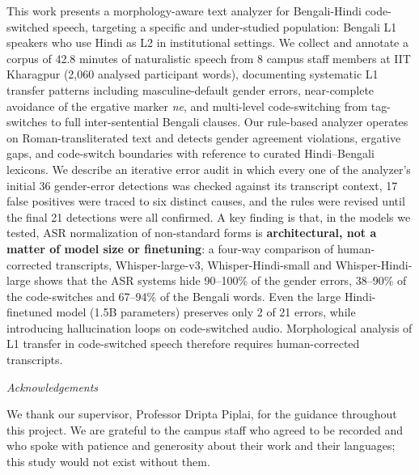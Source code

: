 \documentclass[11pt,a4paper]{report}
\begin{document}
\noindent This work presents a morphology-aware text analyzer for Bengali-Hindi code-switched speech, targeting a specific and under-studied population: Bengali L1 speakers who use Hindi as L2 in institutional settings. We collect and annotate a corpus of 42.8 minutes of naturalistic speech from 8 campus staff members at IIT Kharagpur (2,060 analysed participant words), documenting systematic L1 transfer patterns including masculine-default gender errors, near-complete avoidance of the ergative marker \textit{ne}, and multi-level code-switching from tag-switches to full inter-sentential Bengali clauses. Our rule-based analyzer operates on Roman-transliterated text and detects gender agreement violations, ergative gaps, and code-switch boundaries with reference to curated Hindi--Bengali lexicons. We describe an iterative error audit in which every one of the analyzer's initial 36 gender-error detections was checked against its transcript context, 17 false positives were traced to six distinct causes, and the rules were revised until the final 21 detections were all confirmed. A key finding is that, in the models we tested, ASR normalization of non-standard forms is \textbf{architectural, not a matter of model size or finetuning}: a four-way comparison of human-corrected transcripts, Whisper-large-v3, Whisper-Hindi-small and Whisper-Hindi-large shows that the ASR systems hide 90--100\% of the gender errors, 38--90\% of the code-switches and 67--94\% of the Bengali words. Even the large Hindi-finetuned model (1.5B parameters) preserves only 2 of 21 errors, while introducing hallucination loops on code-switched audio. Morphological analysis of L1 transfer in code-switched speech therefore requires human-corrected transcripts.

\clearpage
{}
{}
\begin{center}{\Huge\itshape Acknowledgements}\end{center}
\vspace{0.2in}
\noindent We thank our supervisor, Professor Dripta Piplai, for the guidance throughout this project. We are grateful to the campus staff who agreed to be recorded and who spoke with patience and generosity about their work and their languages; this study would not exist without them.

\clearpage
{}
{}
\tableofcontents
\clearpage
{}
{}
\listoffigures
\clearpage
{}
{}
\listoftables
\end{document}
